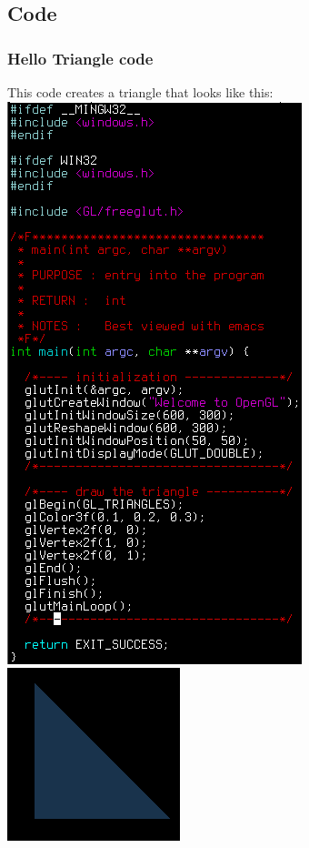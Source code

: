 \documentclass{beamer}
\begin{document}
          \subsection{Code}
          \begin{frame}
            \frametitle{Hello Triangle code}
            \begin{center}
              This code creates a triangle that looks like this:
              \includegraphics[scale=.33]{code.png}
              \includegraphics[scale=.8]{result.png}
            \end{center}
          \end{frame}
\end{document}

